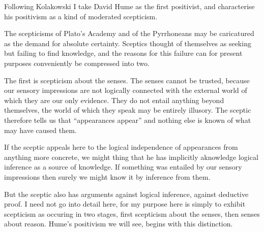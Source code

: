 Following Kolakowski I take David Hume as the first positivist, and characterise his positivism as a kind of moderated scepticism.

The scepticisms of Plato's Academy and of the Pyrrhoneans may be caricatured as the demand for absolute certainty.
Sceptics thought of themselves as seeking but failing to find knowledge, and the reasons for this failure can for present purposes conveniently be compressed into two.

The first is scepticism about the senses.
The senses cannot be trusted, because our sensory impressions are not logically connected with the external world of which they are our only evidence.
They do not entail anything beyond themselves, the world of which they speak may be entirely illusory.
The sceptic therefore tells us that ``appearances appear'' and nothing else is known of what may have caused them.

If the sceptic appeals here to the logical independence of appearances from anything more concrete, we might thing that he has implicitly aknowledge logical inference as a source of knowledge.
If something was entailed by our sensory impressions then surely we might know it by inference from them.

But the sceptic also has arguments against logical inference, against deductive proof.
I need not go into detail here, for my purpose here is simply to exhibit scepticism as occuring in two stages, first scepticism about the senses, then senses about reason.
Hume's positivism we will see, begins with this distinction.
